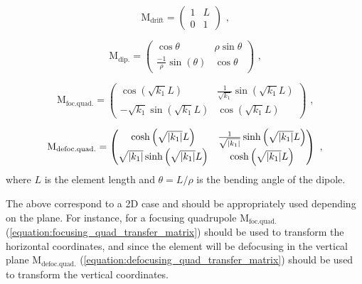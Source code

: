 \begin{equation}
    \mathrm{M_{drift}} = 
        \begin{pmatrix}
            1 & L \\
            0 & 1
        \end{pmatrix} \text{ ,}
    \label{equation:drift_transfer_matrix}
\end{equation}

\begin{equation}
    \mathrm{M_{dip.}} = 
        \begin{pmatrix}
            \cos \theta                                 & \rho \sin \theta \\
            \frac{-1}{\rho} \sin \left( \theta \right)  & \cos \theta
        \end{pmatrix} \text{ ,}
    \label{equation:dipole_transfer_matrix}
\end{equation}

\begin{equation}
    \mathrm{M_{foc. quad.}} = 
        \begin{pmatrix}
            \cos \left( \sqrt{k_1} L \right)             & \frac{1}{\sqrt{k_1}} \sin \left( \sqrt{k_1} L \right) \\
            -\sqrt{k_1} \sin \left( \sqrt{k_1} L \right) & \cos \left( \sqrt{k_1} L \right)
        \end{pmatrix} \text{ ,}
    \label{equation:focusing_quad_transfer_matrix}
\end{equation}

\begin{equation}
    \mathrm{M_{defoc. quad.}} = 
        \begin{pmatrix}
            \cosh \left( \sqrt{\left\lvert k_1 \right\rvert} L \right)                  & \frac{1}{\sqrt{\left\lvert k_1 \right\rvert}} \sinh \left( \sqrt{\left\lvert k_1 \right\rvert} L \right) \\
            \sqrt{\left\lvert k_1 \right\rvert} \sinh \left( \sqrt{\left\lvert k_1 \right\rvert} L \right) & \cosh \left( \sqrt{\left\lvert k_1 \right\rvert} L \right)
        \end{pmatrix} \text{ ,}
    \label{equation:defocusing_quad_transfer_matrix}
\end{equation}
\vspace{1.5mm}
where \(L\) is the element length and \(\theta = L / \rho\) is the bending angle of the dipole.

The above correspond to a \num{2}D case and should be appropriately used depending on the plane.
For instance, for a focusing quadrupole \(\mathrm{M_{foc. quad.}}\) (\cref{equation:focusing_quad_transfer_matrix}) should be used to transform the horizontal coordinates, and since the element will be defocusing in the vertical plane \(\mathrm{M_{defoc. quad.}}\) (\cref{equation:defocusing_quad_transfer_matrix}) should be used to transform the vertical coordinates.

